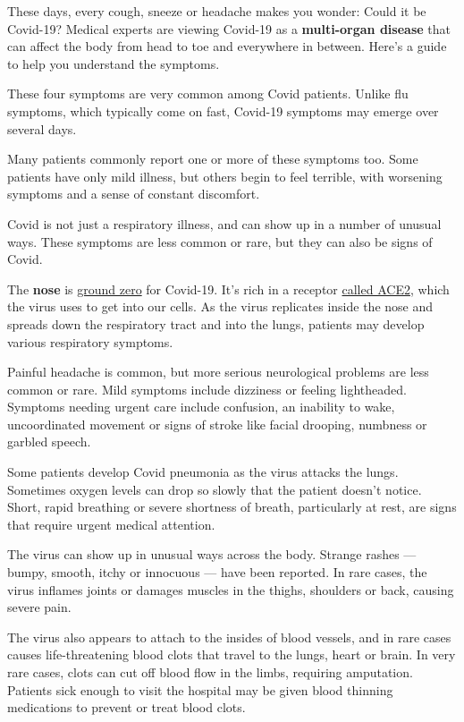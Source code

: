 These days, every cough, sneeze or headache makes you wonder: Could it
be Covid-19? Medical experts are viewing Covid-19 as a
\textbf{multi-organ disease} that can affect the body from head to toe
and everywhere in between. Here's a guide to help you understand the
symptoms.

These four symptoms are very common among Covid patients. Unlike flu
symptoms, which typically come on fast, Covid-19 symptoms may emerge
over several days.

Many patients commonly report one or more of these symptoms too. Some
patients have only mild illness, but others begin to feel terrible, with
worsening symptoms and a sense of constant discomfort.

Covid is not just a respiratory illness, and can show up in a number of
unusual ways. These symptoms are less common or rare, but they can also
be signs of Covid.

The \textbf{nose} is
\href{https://www.nature.com/articles/s41591-020-0868-6}{ground zero}
for Covid-19. It's rich in a receptor
\href{https://www.nytimes3xbfgragh.onion/2020/06/01/health/coronavirus-mysteries.html}{called
ACE2}, which the virus uses to get into our cells. As the virus
replicates inside the nose and spreads down the respiratory tract and
into the lungs, patients may develop various respiratory symptoms.

Painful headache is common, but more serious neurological problems are
less common or rare. Mild symptoms include dizziness or feeling
lightheaded. Symptoms needing urgent care include confusion, an
inability to wake, uncoordinated movement or signs of stroke like facial
drooping, numbness or garbled speech.

Some patients develop Covid pneumonia as the virus attacks the lungs.
Sometimes oxygen levels can drop so slowly that the patient doesn't
notice. Short, rapid breathing or severe shortness of breath,
particularly at rest, are signs that require urgent medical attention.

The virus can show up in unusual ways across the body. Strange rashes
--- bumpy, smooth, itchy or innocuous --- have been reported. In rare
cases, the virus inflames joints or damages muscles in the thighs,
shoulders or back, causing severe pain.

The virus also appears to attach to the insides of blood vessels, and in
rare cases causes life-threatening blood clots that travel to the lungs,
heart or brain. In very rare cases, clots can cut off blood flow in the
limbs, requiring amputation. Patients sick enough to visit the hospital
may be given blood thinning medications to prevent or treat blood clots.

